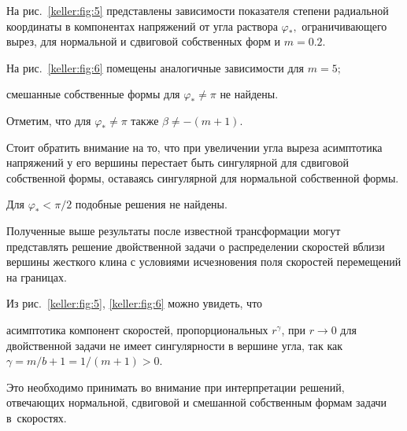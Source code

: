 На рис.~\ref{keller:fig:5} представлены зависимости показателя степени радиальной координаты в компонентах напряжений от угла раствора $\varphi_\ast,$ ограничивающего вырез, для нормальной и сдвиговой собственных форм и $m=0.2.$ 

На рис.~\ref{keller:fig:6} помещены аналогичные зависимости для $m=5;$ 

смешанные собственные формы для $\varphi_\ast\neq\pi$ не найдены. 

Отметим, что для $\varphi_\ast\neq\pi$ также ${\beta\neq-(m+1).}$ 

Стоит обратить внимание на то, что при увеличении угла выреза асимптотика напряжений у его вершины перестает быть сингулярной для сдвиговой собственной формы, оставаясь сингулярной для нормальной собственной формы. 

Для $\varphi_\ast<\pi/2$ подобные решения не найдены.  



Полученные выше результаты после известной трансформации могут представлять решение двойственной задачи о распределении скоростей вблизи вершины жесткого клина с условиями исчезновения поля скоростей перемещений на границах. 

Из рис.~\ref{keller:fig:5}, \ref{keller:fig:6} можно увидеть, что 

асимптотика компонент скоростей, пропорциональных $r^\gamma$, при $r\to 0$ для двойственной задачи не имеет сингулярности в вершине угла, так как $\gamma =m/b+1=1/(m+1)>0.$


Это необходимо принимать во внимание при интерпретации решений, отвечающих нормальной, сдвиговой и смешанной собственным формам задачи в~скоростях.







